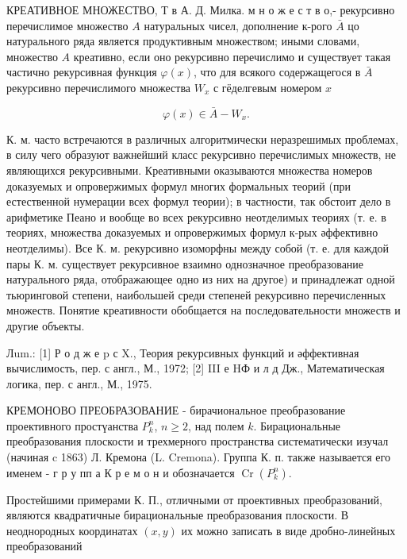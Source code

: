 \documentclass[10pt]{article}
\begin{document}
КРЕАТИВНОЕ МНОЖЕСТВО, Т в А. Д. Милка. м н о ж е с т в о,- рекурсивно перечислимое множество $A$ натуральных чисел, дополнение к-рого $\bar{A}$ цо натурального ряда является продуктивным множеством; иными словами, множество $A$ креативно, если оно рекурсивно перечислимо и существует такая частично рекурсивная функция $\varphi(x)$, что для всякого содержащегося в $\bar{A}$ рекурсивно перечислимого множества $W_{x}$ с гёделгевым номером $x$



\[

\varphi(x) \in \bar{A}-W_{x} .

\]



К. м. часто встречаются в различных алгоритмически неразрешимых проблемах, в силу чего образуют важнейший класс рекурсивно перечислимых множеств, не являющихся рекурсивными. Креативными оказываются множества номеров доказуемых и опровержимых формул многих формальных теорий (при естественной нумерации всех формул теории); в частности, так обстоит дело в арифметике Пеано и вообще во всех рекурсивно неотделимых теориях (т. е. в теориях, множества доказуемых и опровержимых формул к-рых әффективно неотделимы). Все К. м. рекурсивно изоморфны между собой (т. е. для каждой пары К. м. существует рекурсивное взаимно однозначное преобразование натурального ряда, отображающее одно из них на другое) и принадлежат одной тьюринговой степени, наибольшей среди степеней рекурсивно перечисленных множеств. Понятие креативности обобщается на последовательности множеств и другие объекты.



Лum.: [1] Р о д ж е p с X., Теория рекурсивных функций и әффективная вычислимость, пер. с англ., М., 1972; [2] III е HФ и л д Дж., Математическая логика, пер. с англ., М., 1975.



КРЕМОНОВО ПРЕОБРАЗОВАНИЕ - бирачиональное преобразование проективного простүанства $P_{k}^{n}$, $n \geqslant 2$, над полем $k$. Бирациональные преобразования плоскости и трехмерного пространства систематически изучал (начиная c 1863) Л. Кремона (L. Cremona). Группа К. п. также называется его именем - г р у пп а $К$ р е м о н и обозначается $\operatorname{Cr}\left(P_{k}^{n}\right)$.



Простейшими примерами К. П., отличными от проективных преобразований, являются квадратичные бирациональные преобразования плоскости. В неоднородных координатах $(x, y)$ их можно записать в виде дробно-линейных преобразований
\end{document}
